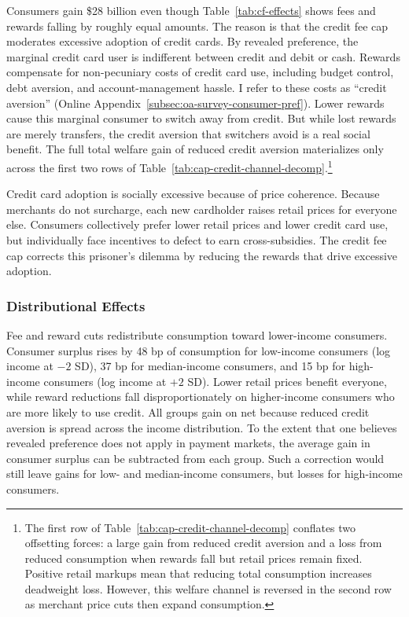 \documentclass[main.tex]{subfiles}
\begin{document}
Consumers gain \$28 billion even though Table~\ref{tab:cf-effects} shows fees and rewards falling by roughly equal amounts.
The reason is that the credit fee cap moderates excessive adoption of credit cards.
By revealed preference, the marginal credit card user is indifferent between credit and debit or cash.
Rewards compensate for non-pecuniary costs of credit card use, including budget control, debt aversion, and account-management hassle.
I refer to these costs as ``credit aversion'' (Online Appendix~\ref{subsec:oa-survey-consumer-pref}).
Lower rewards cause this marginal consumer to switch away from credit.
But while lost rewards are merely transfers, the credit aversion that switchers avoid is a real social benefit.
The full total welfare gain of reduced credit aversion materializes only across the first two rows of Table~\ref{tab:cap-credit-channel-decomp}.\footnote{
    The first row of Table~\ref{tab:cap-credit-channel-decomp} conflates two offsetting forces: a large gain from reduced credit aversion and a loss from reduced consumption when rewards fall but retail prices remain fixed.
    Positive retail markups mean that reducing total consumption increases deadweight loss.
    However, this welfare channel is reversed in the second row as merchant price cuts then expand consumption.
}

Credit card adoption is socially excessive because of price coherence.
Because merchants do not surcharge, each new cardholder raises retail prices for everyone else.
Consumers collectively prefer lower retail prices and lower credit card use, but individually face incentives to defect to earn cross-subsidies.
The credit fee cap corrects this prisoner's dilemma by reducing the rewards that drive excessive adoption.

\subsubsection{Distributional Effects}
\label{subsubsec:counterfactual-distributional}

Fee and reward cuts redistribute consumption toward lower-income consumers.
Consumer surplus rises by 48 bp of consumption for low-income consumers (log income at $-2$ SD),
37 bp for median-income consumers,
and 15 bp for high-income consumers (log income at $+2$ SD).
Lower retail prices benefit everyone, while reward reductions fall disproportionately on higher-income consumers who are more likely to use credit.
All groups gain on net because reduced credit aversion is spread across the income distribution.
To the extent that one believes revealed preference does not apply in payment markets, the average gain in consumer surplus can be subtracted from each group.
Such a correction would still leave gains for low- and median-income consumers, but losses for high-income consumers.
\end{document}
